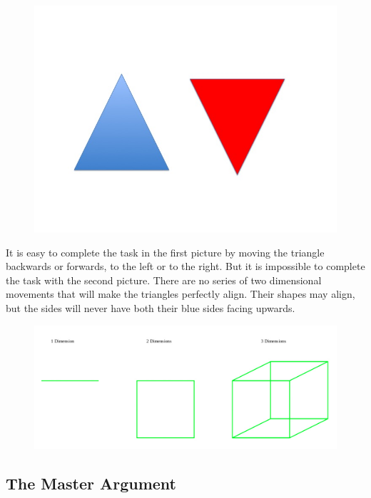 \documentclass[oneside]{article}
\begin{document}
\begin{figure}[h]
  \includegraphics[width=\linewidth]{3d.jpg}
\end{figure}

It is easy to complete the task in the first picture by moving the triangle backwards or forwards, to the left or to the right. But it is impossible to complete the task with the second picture. There are no series of two dimensional movements that will make the triangles perfectly align. Their shapes may align, but the sides will never have both their blue sides facing upwards. 




\begin{figure}[h]
  \includegraphics[width=\linewidth]{dimensions.jpg}
\end{figure}


 

\subsection{The Master Argument}
\end{document}
